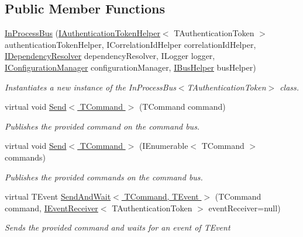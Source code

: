\subsection*{Public Member Functions}
\begin{DoxyCompactItemize}
\item 
\hyperlink{classCqrs_1_1Bus_1_1InProcessBus_a64bea583461562783d97cd98ff0dff91}{In\+Process\+Bus} (\hyperlink{interfaceCqrs_1_1Authentication_1_1IAuthenticationTokenHelper}{I\+Authentication\+Token\+Helper}$<$ T\+Authentication\+Token $>$ authentication\+Token\+Helper, I\+Correlation\+Id\+Helper correlation\+Id\+Helper, \hyperlink{interfaceCqrs_1_1Configuration_1_1IDependencyResolver}{I\+Dependency\+Resolver} dependency\+Resolver, I\+Logger logger, \hyperlink{interfaceCqrs_1_1Configuration_1_1IConfigurationManager}{I\+Configuration\+Manager} configuration\+Manager, \hyperlink{interfaceCqrs_1_1Bus_1_1IBusHelper}{I\+Bus\+Helper} bus\+Helper)
\begin{DoxyCompactList}\small\item\em Instantiates a new instance of the In\+Process\+Bus$<$\+T\+Authentication\+Token$>$ class. \end{DoxyCompactList}\item 
virtual void \hyperlink{classCqrs_1_1Bus_1_1InProcessBus_a6a074ef3663d2855875307b106fe4416}{Send$<$ T\+Command $>$} (T\+Command command)
\begin{DoxyCompactList}\small\item\em Publishes the provided {\itshape command}  on the command bus. \end{DoxyCompactList}\item 
virtual void \hyperlink{classCqrs_1_1Bus_1_1InProcessBus_ae5dae5f2445387280c974ec181167055}{Send$<$ T\+Command $>$} (I\+Enumerable$<$ T\+Command $>$ commands)
\begin{DoxyCompactList}\small\item\em Publishes the provided {\itshape commands}  on the command bus. \end{DoxyCompactList}\item 
virtual T\+Event \hyperlink{classCqrs_1_1Bus_1_1InProcessBus_a506d617dc7ec3838791a91e09b73b8ce}{Send\+And\+Wait$<$ T\+Command, T\+Event $>$} (T\+Command command, \hyperlink{interfaceCqrs_1_1Events_1_1IEventReceiver}{I\+Event\+Receiver}$<$ T\+Authentication\+Token $>$ event\+Receiver=null)
\begin{DoxyCompactList}\small\item\em Sends the provided {\itshape command}  and waits for an event of {\itshape T\+Event}  \end{DoxyCompactList}\item 

\end{DoxyCompactItemize}
